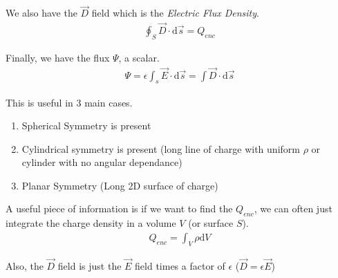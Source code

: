 \documentclass[12pt,letterpaper]{article} \usepackage{amsmath} \usepackage{graphicx} \usepackage[margin=1in]{geometry} \usepackage{longtable}  \usepackage{amssymb}
\begin{document}
	We also have the $\vec D$ field which is the \textit{Electric Flux Density}.
	\begin{align*}
		\oint_S \vec D \cdot \mathrm d \vec s = Q_{enc}
	\end{align*}
	
	Finally, we have the flux $\Psi$, a scalar. 
	\begin{align*}
		\Psi = \epsilon \int_s \vec E \cdot \mathrm d \vec s = \int \vec D \cdot \mathrm d \vec s
	\end{align*}

	This is useful in 3 main cases. 
	\begin{enumerate}[]
		\item Spherical Symmetry is present
		\item Cylindrical symmetry is present (long line of charge with uniform $\rho$ or cylinder with no angular dependance)
		\item Planar Symmetry (Long 2D surface of charge)
	\end{enumerate}

	A useful piece of information is if we want to find the $Q_{enc}$, we can often just integrate the charge density in a volume $V$ (or surface $S$).
	\begin{align*}
		Q_{enc} = \int_V \rho \mathrm d V
	\end{align*}

	Also, the $\vec D$ field is just the $\vec E$ field times a factor of $\epsilon$ ($\vec D = \epsilon \vec E$) 
	
\end{document}

